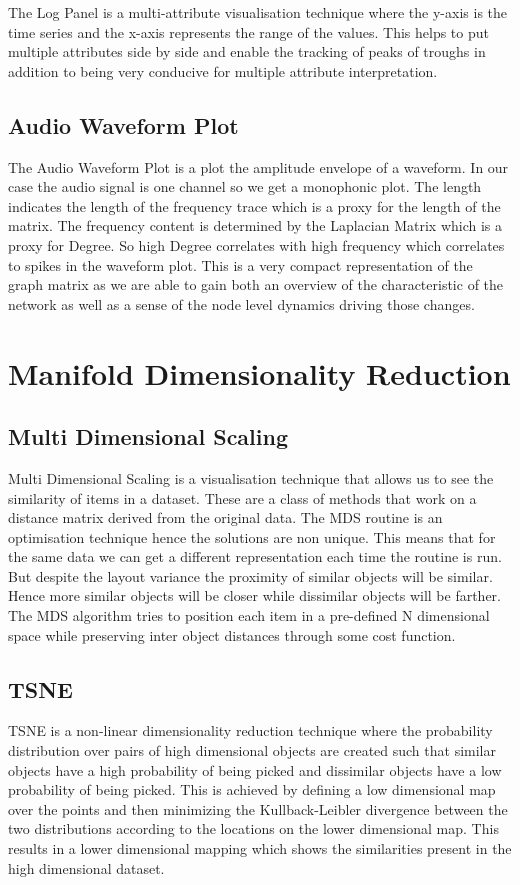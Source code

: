 The Log Panel is a multi-attribute visualisation technique where the y-axis is the time series and the x-axis represents the range of the values. This helps to put multiple attributes side by side and enable the tracking of peaks of troughs in addition to being very conducive for multiple attribute interpretation. 
\subsection{Audio Waveform Plot}

The Audio Waveform Plot is a plot the amplitude envelope of a waveform. In our case the audio signal is one channel so we get a monophonic plot. The length indicates the length of the frequency trace which is a proxy for the length of the matrix. The frequency content is determined by the Laplacian Matrix which is a proxy for Degree. So high Degree correlates with high frequency which correlates to spikes in the waveform plot. This is a very compact representation of the graph matrix as we are able to gain both an overview of the characteristic of the network as well as a sense of the node level dynamics driving those changes. 

\section{Manifold Dimensionality Reduction}

\subsection{Multi Dimensional Scaling}
Multi Dimensional Scaling is a visualisation technique that allows us to see the similarity of items in a dataset. These are a class of methods that work on a distance matrix derived from the original data. The MDS routine is an optimisation technique hence the solutions are non unique. This means that for the same data we can get a different representation each time the routine is run. But despite the layout variance the proximity of similar objects will be similar. Hence more similar objects will be closer while dissimilar objects will be farther. The MDS algorithm tries to position each item in a pre-defined N dimensional space while preserving inter object distances through some cost function. \cite{75a09d90318611daaa61000ea68e967b}\\

\subsection{TSNE}

TSNE is a non-linear dimensionality reduction technique where the probability distribution over pairs of high dimensional objects are created such that similar objects have a high probability of being picked and dissimilar objects have a low probability of being picked. This is achieved by defining a low dimensional map over the points and then minimizing the Kullback-Leibler divergence between the two distributions according to the locations on the lower dimensional map. This results in a lower dimensional mapping which shows the similarities present in the high dimensional dataset.\cite{VanDerMaaten2008}\\